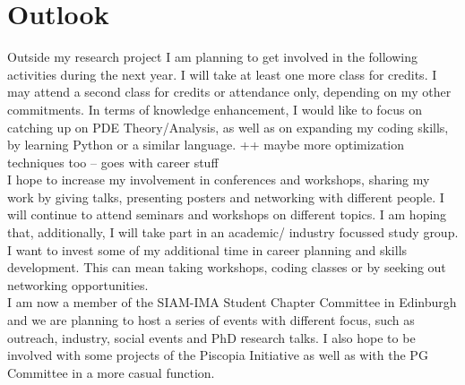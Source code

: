 \documentclass[11pt, a4paper]{article}
\theoremstyle{definition}
\begin{document}
\section{Outlook}
Outside my research project I am planning to get involved in the following activities during the next year.
I will take at least one more class for credits. I may attend a second class for credits or attendance only, depending on my other commitments. In terms of knowledge enhancement, I would like to focus on catching up on PDE Theory/Analysis, as well as on expanding my coding skills, by learning Python or a similar language. ++ maybe more optimization techniques too -- goes with career stuff\\
I hope to increase my involvement in conferences and workshops, sharing my work by giving talks, presenting posters and networking with different people. I will continue to attend seminars and workshops on different topics. I am hoping that, additionally, I will take part in an academic/ industry focussed study group.\\
I want to invest some of my additional time in career planning and skills development. This can mean taking workshops, coding classes or by seeking out networking opportunities.\\ 	
I am now a member of the SIAM-IMA Student Chapter Committee in Edinburgh and we are planning to host a series of events with different focus, such as outreach, industry, social events and PhD research talks. 
I also hope to be involved with some projects of the Piscopia Initiative as well as with the PG Committee in a more casual function. \\


 

	
	
\end{document}
